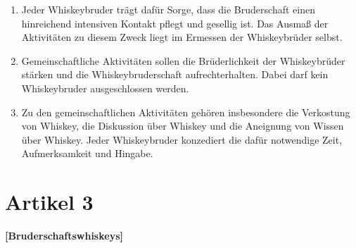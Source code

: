 \documentclass[a4paper,12pt]{article}
\begin{document}
\begin{enumerate}

\item Jeder Whiskeybruder trägt dafür Sorge, dass die Bruderschaft einen hinreichend intensiven
  Kontakt pflegt und gesellig ist. Das Ausmaß der Aktivitäten zu diesem Zweck liegt im Ermessen der
  Whiskeybrüder selbst.

\item Gemeinschaftliche Aktivitäten sollen die Brüderlichkeit der Whiskeybrüder stärken und die
  Whiskeybruderschaft aufrechterhalten. Dabei darf kein Whiskeybruder ausgeschlossen werden.

\item Zu den gemeinschaftlichen Aktivitäten gehören insbesondere die Verkostung von Whiskey, die
  Diskussion über Whiskey und die Aneignung von Wissen über Whiskey. Jeder Whiskeybruder konzediert
  die dafür notwendige Zeit, Aufmerksamkeit und Hingabe.

\end{enumerate}



\section*{Artikel 3}
\textbf{[Bruderschaftswhiskeys]}
\end{document}
